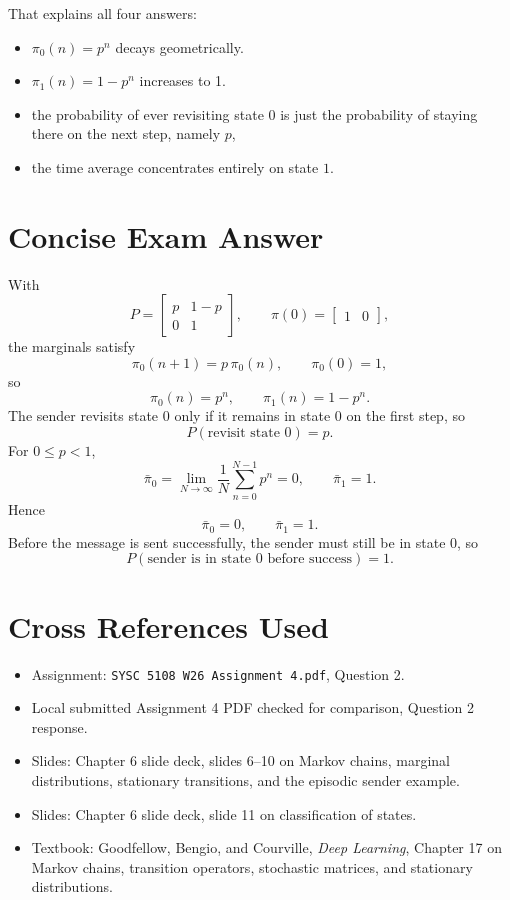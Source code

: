 \documentclass[11pt]{article}
\begin{document}
That explains all four answers:
\begin{itemize}
\item \(\pi_0(n)=p^n\) decays geometrically.
\item \(\pi_1(n)=1-p^n\) increases to 1.
\item the probability of ever revisiting state \(0\) is just the probability of staying there on the next step, namely \(p\),
\item the time average concentrates entirely on state \(1\).
\end{itemize}

\section*{Concise Exam Answer}

With
\[
P=
\begin{bmatrix}
p & 1-p\\
0 & 1
\end{bmatrix},
\qquad
\pi(0)=
\begin{bmatrix}
1 & 0
\end{bmatrix},
\]
the marginals satisfy
\[
\pi_0(n+1)=p\,\pi_0(n),\qquad \pi_0(0)=1,
\]
so
\[
\boxed{\pi_0(n)=p^n,\qquad \pi_1(n)=1-p^n.}
\]
The sender revisits state \(0\) only if it remains in state \(0\) on the first step, so
\[
\boxed{P(\text{revisit state }0)=p.}
\]
For \(0\le p<1\),
\[
\bar\pi_0=\lim_{N\to\infty}\frac{1}{N}\sum_{n=0}^{N-1}p^n=0,
\qquad
\bar\pi_1=1.
\]
Hence
\[
\boxed{\bar\pi_0=0,\qquad \bar\pi_1=1.}
\]
Before the message is sent successfully, the sender must still be in state \(0\), so
\[
\boxed{P(\text{sender is in state }0\text{ before success})=1.}
\]

\section*{Cross References Used}

\begin{itemize}
\item Assignment: \texttt{SYSC 5108 W26 Assignment 4.pdf}, Question 2.
\item Local submitted Assignment 4 PDF checked for comparison, Question 2 response.
\item Slides: Chapter 6 slide deck, slides 6--10 on Markov chains, marginal distributions, stationary transitions, and the episodic sender example.
\item Slides: Chapter 6 slide deck, slide 11 on classification of states.
\item Textbook: Goodfellow, Bengio, and Courville, \textit{Deep Learning}, Chapter 17 on Markov chains, transition operators, stochastic matrices, and stationary distributions.
\end{itemize}
\end{document}
